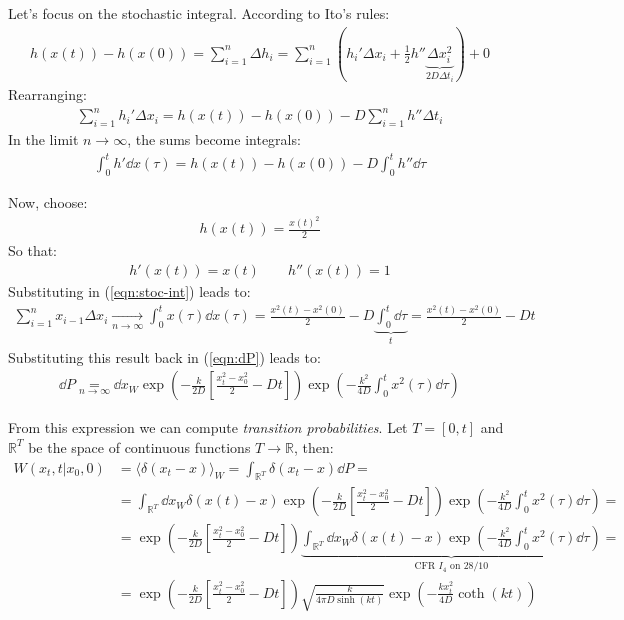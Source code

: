 \documentclass[../template.tex]{subfiles}
\begin{document}
Let's focus on the stochastic integral.
According to Ito's rules:
\begin{align*}
    h(x(t)) - h(x(0)) = \sum_{i=1}^n \Delta h_i = \sum_{i=1}^n (h_i' \Delta x_i + \frac{1}{2} h'' \underbrace{\Delta x_i^2}_{2 D \Delta t_i}  ) + 0
\end{align*}
Rearranging:
\begin{align*}
    \sum_{i=1}^n h_i' \Delta x_i = h(x(t)) - h(x(0)) - D \sum_{i=1}^n h'' \Delta t_i
\end{align*}
In the limit $n \to \infty$, the sums become integrals:
\begin{align}
    \label{eqn:stoc-int}
    \int_{0}^t h' \dd{x(\tau)} = h(x(t)) - h(x(0)) - D \int_0^t h'' \dd{\tau}
\end{align}

Now, choose:
\begin{align*}
    h(x(t)) = \frac{x(t)^2}{2} 
\end{align*}
So that:
\begin{align*}
    h'(x(t)) = x(t) \qquad h''(x(t)) = 1
\end{align*}
Substituting in (\ref{eqn:stoc-int}) leads to:
\begin{align*}
    \sum_{i=1}^n x_{i-1} \Delta x_i  \xrightarrow[n \to \infty]{}  \int_0^t x(\tau) \dd{x(\tau)} = \frac{x^2(t) - x^2(0)}{2} - D\underbrace{\int_0^t \dd{\tau}}_{t} = \frac{x^2(t) - x^2(0)}{2} - Dt   
\end{align*}
Substituting this result back in (\ref{eqn:dP}) leads to:
\begin{align*}
    \dd{P} \underset{n \to \infty}{=}   \dd{x_W} \exp\left(-\frac{k}{2D} \left[\frac{x_t^2 - x_0^2}{2} - Dt \right] \right) \exp\left(-\frac{k^2}{4D} \int_0^t x^2(\tau) \dd{\tau} \right) 
\end{align*}

From this expression we can compute \textit{transition probabilities}. Let $T = [0,t]$ and $\mathbb{R}^T$ be the space of continuous functions $T \to \mathbb{R}$, then:
\begin{align} \nonumber
    W(x_t,t|x_0, 0) &= \langle \delta(x_t - x) \rangle_W = \int_{\mathbb{R}^T} \delta(x_t - x) \dd{P} =\\ \nonumber
    &= \int_{\mathbb{R}^T} \dd{x_W} \delta(x(t) - x) \exp\left(-\frac{k}{2 D} \left[\frac{x_t^2 - x_0^2}{2} - Dt\right]  \right) \exp\left(-\frac{k^2}{4 D} \int_0^t x^2(\tau) \dd{\tau} \right) =\\ \nonumber
    &= \exp\left(-\frac{k}{2D} \left[\frac{x_t^2 - x_0^2}{2} - Dt \right]\right) \underbrace{\int_{\mathbb{R}^T} \dd{x_W} \delta(x(t)-x) \exp\left(-\frac{k^2}{4 D} \int_0^t x^2(\tau) \dd{\tau} \right)}_{\text{CFR $I_4$ on 28/10}} =\\
    &= \exp\left(-\frac{k}{2D} \left[\frac{x_t^2 - x_0^2}{2} - Dt \right] \right) \sqrt{\frac{k}{4 \pi D \sinh (kt)} } \exp\left(-\frac{k x_t^2}{4 D} \coth(kt)\right)
    \label{eqn:tran-prob}
\end{align} 
\end{document}
